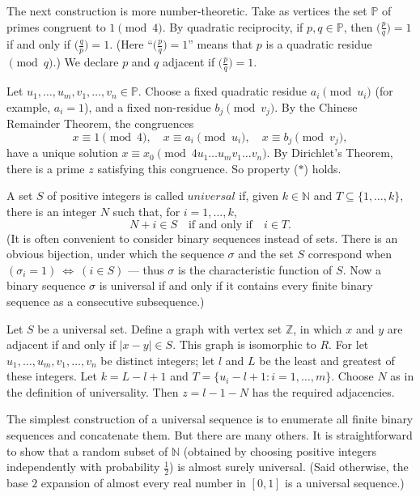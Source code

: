\documentclass[12pt]{article}
\begin{document}
The next construction is more number-theoretic. Take as vertices the
set $\mathbb{P}$ of primes congruent to $1 \pmod{4}$. By quadratic
reciprocity, if $p,q \in\mathbb{P}$, then $\big(\frac{p}{q}\big) = 1$ if
and only if $\big(\frac{q}{p}\big) = 1$. (Here ``$\big(\frac{p}{q}\big) = 1$''
means that $p$ is a quadratic residue $\pmod{q}$.) We declare $p$ and $q$
adjacent if $\big(\frac{p}{q}\big)= 1$.

Let $u_1, \ldots, u_m, v_1, \ldots, v_n\in\mathbb{P}$. Choose a
fixed quadratic residue $a_i\pmod{u_i}$ (for example, $a_i = 1$),
and a fixed non-residue $b_j\pmod{v_j}$. By the Chinese Remainder
Theorem, the congruences
\[ 
x \equiv 1\pmod{4},\quad x \equiv a_i \pmod{u_i},\quad x \equiv b_j \pmod{v_j},
\]
have a unique solution $x \equiv x_0\pmod {4u_1 \ldots u_m v_1
\ldots  v_n}$. By Dirichlet's Theorem, there is a prime $z$
satisfying this congruence. So property ($\ast$) holds.

A set $S$ of positive integers is called $universal$ if, given
$k\in\mathbb{N}$ and $T \subseteq \{1,\ldots, k\}$, there is an
integer $N$ such that, for $i = 1, \ldots,k$,
\[
N+ i \in S\quad\mbox{if and only if}\quad i \in  T.
\]
(It is often convenient to consider binary sequences instead of
sets. There is an obvious bijection, under which the sequence
$\sigma$ and the set $S$ correspond when $(\sigma_i = 1)
~\Leftrightarrow~(i \in S)$ --- thus $\sigma$ is the characteristic
function of $S$. Now a binary sequence $\sigma$ is universal if and
only if it contains every finite binary sequence as a consecutive
subsequence.)

Let $S$ be a universal set. Define a graph with vertex set
$\mathbb{Z}$, in which $x$ and $y$ are adjacent if and only if 
$|x-y|\in S$. This graph is isomorphic to $R$. For let $u_1, \ldots,
u_m, v_1, \ldots, v_n$ be distinct integers; let $l$ and $L$ be the
least and greatest of these integers. Let $k = L - l + 1$ and $T =
\{u_i - l + 1 : i = 1, \ldots, m\}$. Choose $N$ as in the
definition of universality. Then $z = l - 1 - N$ has the required
adjacencies.

The simplest construction of a universal sequence is to enumerate
all finite binary sequences and concatenate them. But there are many
others. It is straight\-forward to show that a random subset of
$\mathbb{N}$ (obtained by choosing positive integers independently
with probability $\frac{1}{2}$) is almost surely universal. (Said
otherwise, the base $2$ expansion of almost every real number in 
$[0,1]$ is a universal sequence.)
\end{document}
